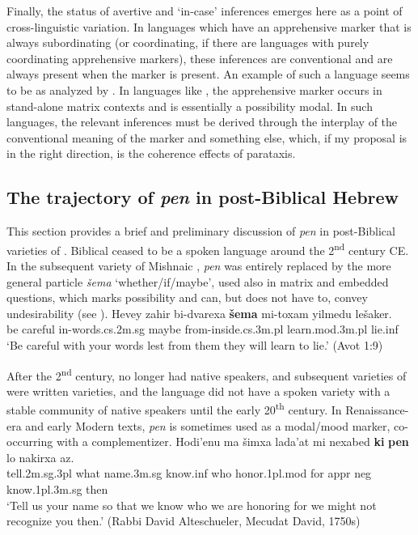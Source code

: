 \documentclass[output=paper,colorlinks,citecolor=brown]{langscibook}
\begin{document}
Finally, the status of avertive and `in-case' inferences emerges here as a point of cross-linguistic variation. In languages which have an apprehensive marker that is always subordinating (or coordinating, if there are languages with purely coordinating apprehensive markers), these inferences are conventional and are always present when the marker is present. An example of such a language seems to be  as analyzed by \citet{anderbois21}. In languages like , the apprehensive marker occurs in stand-alone matrix contexts and is essentially a possibility modal. In such languages, the relevant inferences must be derived through the interplay of the conventional meaning of the marker and something else, which, if my proposal is in the right direction, is the coherence effects of parataxis.  
 

\subsection{The trajectory of \textit{pen} in post-Biblical Hebrew}
\label{subsec:trajectory}
This section provides a brief and preliminary discussion of \textit{pen} in post-Biblical varieties of . Biblical  ceased to be a spoken language around the 2\textsuperscript{nd} century CE. In the subsequent variety of Mishnaic , \textit{pen} was entirely replaced by the more general particle \textit{šema} `whether/if/maybe', used also in matrix and embedded questions, which marks possibility and can, but does not have to, convey undesirability (see \citealt{segal01}).
\ea
\gll Hevey zahir bi-dvarexa \textbf{šema} mi-toxam yilmedu lešaker. \\
be careful in-words.{\sc cs.2m.sg} maybe from-inside.{\sc cs.3m.pl} learn.{\sc mod.3m.pl} lie.{\sc inf} \\
\glt `Be careful with your words lest from them they will learn to lie.' (Avot 1:9)  
\z

After the 2\textsuperscript{nd} century,  no longer had native speakers, and subsequent varieties of  were written varieties, and the language did not have a spoken variety with a stable community of native speakers until the early 20\textsuperscript{th} century. In Renaissance-era and early Modern  texts, \textit{pen} is sometimes used as a modal/mood marker, co-occurring with a complementizer.
\ea
\gll Hodi'enu ma šimxa lada'at mi nexabed \textbf{ki} \textbf{pen} lo nakirxa az. \\
 tell.{\sc 2m.sg.3pl} what name.{\sc 3m.sg} know.{\sc inf}  who honor.{\sc 1pl.mod} for {\sc appr} {\sc neg} know.{\sc 1pl.3m.sg} then\\
\glt `Tell us your name so that we know who we are honoring for we might not recognize you then.' (Rabbi David Alteschueler, Mecudat David,  1750s)
\z
\end{document}
